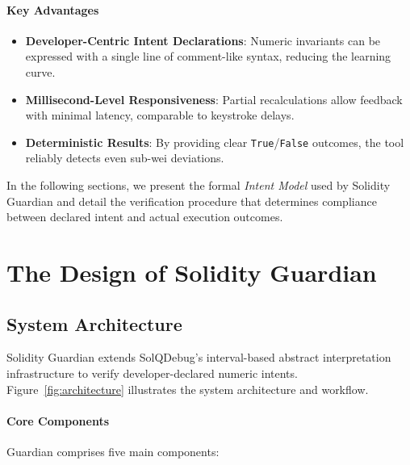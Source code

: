 \documentclass[pdflatex,sn-basic]{sn-jnl}%
\theoremstyle{thmstyleone}%
\theoremstyle{thmstyletwo}%
\theoremstyle{thmstylethree}%
\begin{document}
\paragraph{Key Advantages}
\begin{itemize}
    \item \textbf{Developer-Centric Intent Declarations}:  
    Numeric invariants can be expressed with a single line of comment-like syntax, reducing the learning curve.
    
    \item \textbf{Millisecond-Level Responsiveness}:  
    Partial recalculations allow feedback with minimal latency, comparable to keystroke delays.
    
    \item \textbf{Deterministic Results}:  
    By providing clear \texttt{True}/\texttt{False} outcomes, the tool reliably detects even sub-wei deviations.
\end{itemize}

In the following sections, we present the formal \textit{Intent Model} used by Solidity Guardian and detail the verification procedure that determines compliance between declared intent and actual execution outcomes.


\section{The Design of Solidity Guardian}

\subsection{System Architecture}

Solidity Guardian extends SolQDebug's interval-based abstract interpretation infrastructure to verify developer-declared numeric intents. Figure~\ref{fig:architecture} illustrates the system architecture and workflow.

\paragraph{Core Components}
Guardian comprises five main components:
\end{document}
